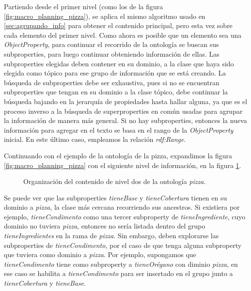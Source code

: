 Partiendo desde el primer nivel (como los de la figura \ref{fig:macro_planning_pizza}), se aplica el mismo algoritmo usado en \ref{sec:agrupando_info} para obtener el contenido principal, pero esta vez sobre cada elemento del primer nivel. Como ahora es posible que un elemento sea una \emph{ObjectProperty}, para continuar el recorrido de la ontología se buscan sus subproperties, para luego continuar obteniendo información de ellas. Las subproperties elegidas deben contener en su dominio, a la clase que haya sido elegida como tópico para ese grupo de información que se está creando. La búsqueda de subproperties debe ser exhaustiva, pues si no se encuentran subproperties que tengan en su dominio a la clase tópico, debe continuar la búsqueda bajando en la jerarquía de propiedades hasta hallar alguna, ya que es el proceso inverso a la búsqueda de superproperties en común usadas para agrupar la información de manera más general. Si no hay subproperties, entonces la nueva información para agregar en el texto se basa en el rango de la \emph{ObjectProperty} inicial. En este último caso, empleamos la relación \emph{rdf:Range}.

Continuando con el ejemplo de la ontología de la pizza, expandimos la figura \ref{fig:macro_planning_pizza} con el siguiente nivel de información, en la figura \ref{fig:macro_planning_pizza_n2}. 
\begin{figure}[H]
\caption{Organización del contenido de nivel dos de la ontología \emph{pizza}.}
\label{fig:macro_planning_pizza_n2}
\end{figure}

Se puede ver que las subproperties \emph{tieneBase} y \emph{tieneCobertura} tienen en su dominio a \emph{pizza}, la clase más cercana recorriendo sus ancestros. Si existiera por ejemplo, \emph{tieneCondimento} como una tercer subproperty de \emph{tieneIngrediente}, cuyo dominio no tuviera \emph{pizza}, entonces no sería listada dentro del grupo \emph{tieneIngredientes} en la rama de \emph{pizza}. Sin embargo, deben explorarse las subproperties de \emph{tieneCondimento}, por el caso de que tenga alguna subproperty que tuviera como dominio a \emph{pizza}. Por ejemplo, supongamos que \emph{tieneCondimento} tiene como subproperty a \emph{tieneOrégano} con diminio \emph{pizza}, en ese caso se habilita a \emph{tieneCondimento} para ser insertado en el grupo junto a  \emph{tieneCobertura} y \emph{tieneBase}.  

